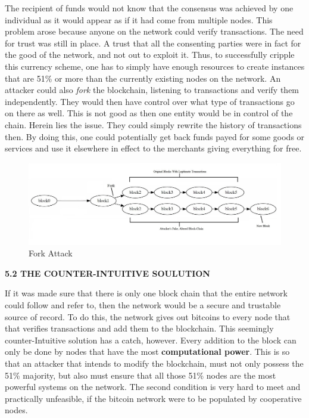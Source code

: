 \documentclass[12pt,a4paper]{report}
\begin{document}
\begin{justify}
The recipient of funds would not know that the consensus was achieved by one individual as it would appear as if it had come from multiple nodes. This problem arose because anyone on the network could verify transactions. The need for trust was still in place. A trust that all the consenting parties were in fact for the good of the network, and not out to exploit it.\newline
Thus, to successfully cripple this currency scheme, one has to simply have enough resources to create instances that are 51\% or more than the currently existing nodes on the network.\newline
An attacker could also \textit{fork} the blockchain, listening to transactions and verify them independently. They would then have control over what type of transactions go on there as well. This is not good as then one entity would be in control of the chain. Herein lies the issue. They could simply rewrite the history of transactions then. By doing this, one could potentially get back funds payed for some goods or services and use it elsewhere in effect to the merchants giving everything for free.
\newline

\vspace{10mm}
\begin{figure}[h]
\centering
\caption{Fork Attack \cite{fork}}
\includegraphics[scale=0.4]{pics/fork.jpg}
\end{figure}


\vspace{10mm}
\vspace{10mm}
\textbf{5.2 THE COUNTER-INTUITIVE SOULUTION}
\vspace{10mm}

If it was made sure that there is only one block chain that the entire network could follow and refer to, then the network would be a secure and trustable source of record. To do this, the network gives out bitcoins to every node that that verifies transactions and add them to the blockchain. \newline
This seemingly counter-Intuitive solution has a catch, however. Every addition to the block can only be done by nodes that have the most \textbf{computational power}. This is so that an attacker that intends to modify the blockchain, must not only possess the 51\% majority, but also must ensure that all those 51\% nodes are the most powerful systems on the network. The second condition is very hard to meet and practically unfeasible, if the bitcoin network were to be populated by cooperative nodes. \newline


\end{justify}
\end{document}
